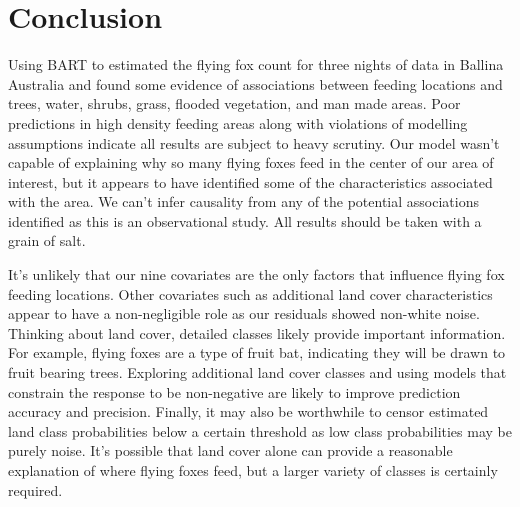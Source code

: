 \documentclass[
  12pt,
  letterpaper,
  DIV=11,
  numbers=noendperiod]{scrartcl}
\begin{document}
\section{Conclusion}\label{conclusion}

Using BART to estimated the flying fox count for three nights of data in
Ballina Australia and found some evidence of associations between
feeding locations and trees, water, shrubs, grass, flooded vegetation,
and man made areas. Poor predictions in high density feeding areas along
with violations of modelling assumptions indicate all results are
subject to heavy scrutiny. Our model wasn't capable of explaining why so
many flying foxes feed in the center of our area of interest, but it
appears to have identified some of the characteristics associated with
the area. We can't infer causality from any of the potential
associations identified as this is an observational study. All results
should be taken with a grain of salt.

It's unlikely that our nine covariates are the only factors that
influence flying fox feeding locations. Other covariates such as
additional land cover characteristics appear to have a non-negligible
role as our residuals showed non-white noise. Thinking about land cover,
detailed classes likely provide important information. For example,
flying foxes are a type of fruit bat, indicating they will be drawn to
fruit bearing trees. Exploring additional land cover classes and using
models that constrain the response to be non-negative are likely to
improve prediction accuracy and precision. Finally, it may also be
worthwhile to censor estimated land class probabilities below a certain
threshold as low class probabilities may be purely noise. It's possible
that land cover alone can provide a reasonable explanation of where
flying foxes feed, but a larger variety of classes is certainly
required. \newpage


  
\end{document}
